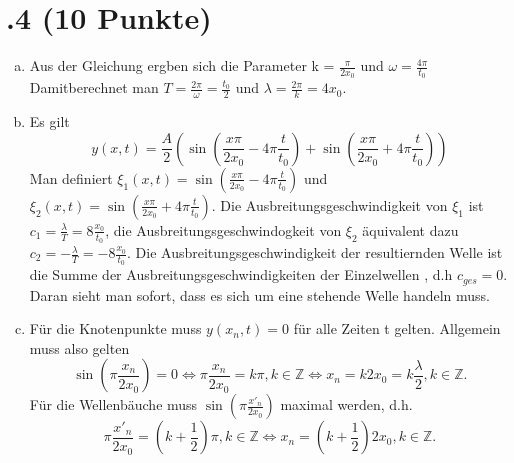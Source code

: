 \section*{\nr.4 \titfour (10 Punkte)}
\begin{enumerate}[(a)]
\item Aus der Gleichung ergben sich die Parameter k = $\frac{\pi}{2 x_0}$ und $\omega = \frac{4 \pi}{t_0}$ Damitberechnet man $T = \frac{2 \pi}{\omega} = \frac{t_0}{2}$ und $\lambda = \frac{2 \pi}{k} = 4 x_0$.
\item Es gilt 
\begin{equation}
	y(x,t) = \frac{A}{2} \left( \sin \left( \frac{x\pi}{2 x_0} - 4 \pi \frac{t}{t_0} \right) +\sin \left(\frac{x\pi}{2 x_0} +4 \pi \frac{t}{t_0}\right) \right)
\end{equation}
Man definiert $\xi_1 (x,t) = \sin \left( \frac{x\pi}{2 x_0} - 4 \pi \frac{t}{t_0} \right)$ und $\xi_2 (x,t) = \sin \left( \frac{x\pi}{2 x_0} + 4 \pi \frac{t}{t_0} \right)$. Die Ausbreitungsgeschwindigkeit von $\xi_1$ ist $c_1 = \frac{\lambda}{T} = 8 \frac{x_0}{t_0}$, die Ausbreitungsgeschwindogkeit von $\xi_2$ äquivalent dazu $c_2 = -\frac{\lambda}{T} =-8 \frac{x_0}{t_0}$. Die Ausbreitungsgeschwindigkeit der resultiernden Welle ist die Summe der Ausbreitungsgeschwindigkeiten der Einzelwellen , d.h $c_{ges} = 0$. Daran sieht man sofort, dass es sich um eine stehende Welle handeln muss.
\item Für die Knotenpunkte  muss $y(x_n, t) = 0$ für alle Zeiten t gelten. Allgemein muss also gelten
\begin{equation}
	\sin \left( \pi\frac{x_n}{2 x_0}  \right) = 0 \Leftrightarrow \pi\frac{x_n}{2 x_0} = k\pi, k \in \mathbb{Z} \Leftrightarrow x_n = k 2 x_0 = k \frac{\lambda}{2}, k \in \mathbb{Z}.
\end{equation}
Für die Wellenbäuche muss $\sin \left( \pi\frac{x'_n}{2 x_0}  \right)$ maximal werden, d.h.
\begin{equation}
	\pi\frac{x'_n}{2 x_0} = (k+\frac{1}{2})\pi, k \in \mathbb{Z} \Leftrightarrow x_n = (k+\frac{1}{2})2 x_0,  k \in \mathbb{Z}.
\end{equation}
\end{enumerate}
